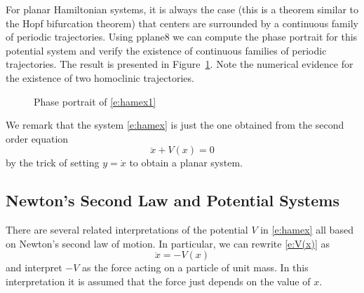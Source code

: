 \documentclass{ximera}
\begin{document}
For planar Hamiltonian systems, it is always the case (this is a theorem
similar to the Hopf bifurcation theorem) that centers are surrounded by 
a continuous family of periodic 
trajectories.  Using 
{\sf pplane8} we can
compute the phase portrait for 
this potential system and verify the 
existence of continuous families of periodic trajectories.  The result 
is presented in Figure~\ref{F:hamex}.  Note the numerical evidence for 
the existence of two homoclinic trajectories.  
\begin{figure}[htb]
           \centerline{%
	   }
           \caption{Phase portrait of \protect\eqref{e:hamex1}}
           \label{F:hamex}
\end{figure}

We remark that the system \eqref{e:hamex} is just the one obtained from the 
second order equation 
\begin{equation}  \label{e:V(x)}
\ddot{x} + V(x) = 0
\end{equation}
by the trick of setting $y=\dot{x}$ to obtain a planar system. 

\subsection*{Newton's Second Law and Potential Systems}

There are several related interpretations of the potential $V$ in
\eqref{e:hamex} all based on Newton's second law of motion. 
  In particular, we can rewrite \eqref{e:V(x)} as 
\[
\ddot{x} =  -V(x)
\]
and interpret $-V$ as the force acting on a 
particle of unit mass.  In this 
interpretation it is assumed that the force just depends on the value of $x$. 
\end{document}
